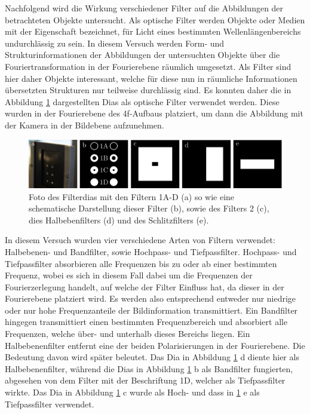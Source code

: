 Nachfolgend wird die Wirkung verschiedener Filter auf die Abbildungen der betrachteten Objekte untersucht. Als optische Filter werden Objekte oder Medien mit der Eigenschaft bezeichnet, für Licht eines bestimmten Wellenlängenbereichs undurchlässig zu sein. In diesem Versuch werden Form- und Strukturinformationen der Abbildungen der untersuchten Objekte über die Fouriertransformation in der Fourierebene räumlich umgesetzt. Als Filter sind hier daher Objekte interessant, welche für diese nun in räumliche Informationen übersetzten Strukturen nur teilweise durchlässig sind. Es konnten daher die in Abbildung \ref{fig:filter} dargestellten Dias als optische Filter verwendet werden. Diese wurden in der Fourierebene des 4f-Aufbaus platziert, um dann die Abbildung mit der Kamera in der Bildebene aufzunehmen.

\begin{figure}[h]
	\centering
	\includegraphics{images/filter/abb.pdf}
	\caption[Verwendete Filter]{
		Foto des Filterdias mit den Filtern 1A-D (a) so wie eine schematische Darstellung dieser Filter (b), sowie des Filters 2 (c), dies Halbebenfilters (d) und des Schlitzfilters (e).
	}
	\label{fig:filter}
\end{figure}

In diesem Versuch wurden vier verschiedene Arten von Filtern verwendet: Halbebenen- und Bandfilter, sowie Hochpass- und Tiefpassfilter. Hochpass- und Tiefpassfilter absorbieren alle Frequenzen bis zu oder ab einer bestimmten Frequenz, wobei es sich in diesem Fall dabei um die Frequenzen der Fourierzerlegung handelt, auf welche der Filter Einfluss hat, da dieser in der Fourierebene platziert wird. Es werden also entsprechend entweder nur niedrige oder nur hohe Frequenzanteile der Bildinformation transmittiert. Ein Bandfilter hingegen transmittiert einen bestimmten Frequenzbereich und absorbiert alle Frequenzen, welche über- und unterhalb dieses Bereichs liegen. Ein Halbebenenfilter entfernt eine der beiden Polarisierungen in der Fourierebene. Die Bedeutung davon wird später beleutet. Das Dia in Abbildung \ref{fig:filter} d diente hier als Halbebenenfilter, während die Dias in Abbildung \ref{fig:filter} b als Bandfilter fungierten, abgesehen von dem Filter mit der Beschriftung 1D, welcher als Tiefpassfilter wirkte. Das Dia in Abbildung \ref{fig:filter} c wurde als Hoch- und dass in \ref{fig:filter} e als Tiefpassfilter verwendet. 

